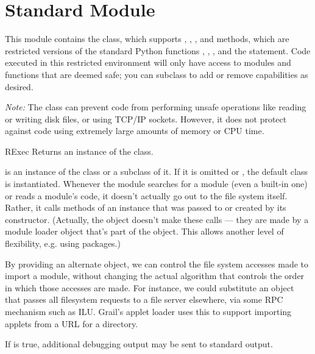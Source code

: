 \section{Standard Module }
\label{module-rexec}


This module contains the  class, which supports
, , , and
 methods, which are restricted versions of the standard
Python functions , , , and
the  statement.
Code executed in this restricted environment will
only have access to modules and functions that are deemed safe; you
can subclass  to add or remove capabilities as desired.

\emph{Note:} The  class can prevent code from performing
unsafe operations like reading or writing disk files, or using TCP/IP
sockets.  However, it does not protect against code using extremely
large amounts of memory or CPU time.  

\begin{classdesc}{RExec}{}
Returns an instance of the  class.  

 is an instance of the  class or a subclass of it.
If it is omitted or , the default  class is
instantiated.
Whenever the  module searches for a module (even a
built-in one) or reads a module's code, it doesn't actually go out to
the file system itself.  Rather, it calls methods of an 
instance that was passed to or created by its constructor.  (Actually,
the  object doesn't make these calls --- they are made by
a module loader object that's part of the  object.  This
allows another level of flexibility, e.g. using packages.)

By providing an alternate  object, we can control the
file system accesses made to import a module, without changing the
actual algorithm that controls the order in which those accesses are
made.  For instance, we could substitute an  object that
passes all filesystem requests to a file server elsewhere, via some
RPC mechanism such as ILU.  Grail's applet loader uses this to support
importing applets from a URL for a directory.

If  is true, additional debugging output may be sent to
standard output.
\end{classdesc}

